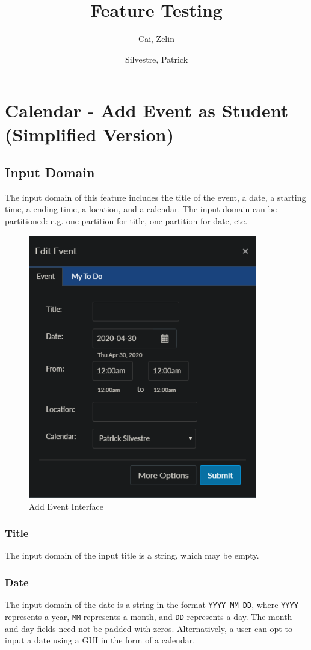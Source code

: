 \documentclass[10pt,letterpaper]{article}
\title{Feature Testing}
\author{
	Cai, Zelin\\
	\and
	Silvestre, Patrick\\
}
\date{}
\begin{document}
\maketitle
\section{Calendar - Add Event as Student (Simplified Version)}
\subsection{Input Domain}
The input domain of this feature includes the title of the event, a date, a starting time, a ending time, a location, and a calendar. The input domain can be partitioned: e.g. one partition for title, one partition for date, etc.

\begin{figure}[h!]
	\centerline{\includegraphics[width=10cm]{screenshots/edit-event.png}}
	\caption{Add Event Interface}
\end{figure}

\newpage
\subsubsection{Title}
The input domain of the input title is a string, which may be empty.

\subsubsection{Date}
The input domain of the date is a string in the format \texttt{YYYY-MM-DD}, where \texttt{YYYY} represents a year, \texttt{MM} represents a month, and \texttt{DD} represents a day. The month and day fields need not be padded with zeros. Alternatively, a user can opt to input a date using a GUI in the form of a calendar.
\end{document}
